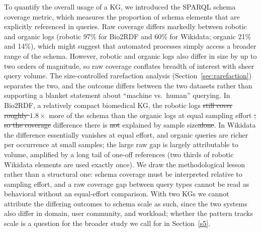 \documentclass[sw]{iosart2x}
\providecommand{\DIFadd}[1]{{\protect\color{blue}\uwave{#1}}} %
\providecommand{\DIFdel}[1]{{\protect\color{red}\sout{#1}}} %
\providecommand{\DIFaddbegin}{} %
\providecommand{\DIFaddend}{} %
\providecommand{\DIFdelbegin}{} %
\providecommand{\DIFdelend}{} %
\providecommand{\DIFscaledelfig}{0.5}
\newlength{\DIFdelgraphicswidth} %
\newlength{\DIFdelgraphicsheight} %
\providecommand{\DIFaddincludegraphics}[2][]{{\color{blue}\fbox{\DIFOincludegraphics[#1]{#2}}}} %
\providecommand{\DIFdelincludegraphics}[2][]{%
\sbox{\DIFdelgraphicsbox}{\DIFOincludegraphics[#1]{#2}}%
\settoboxwidth{\DIFdelgraphicswidth}{\DIFdelgraphicsbox} %
\settoboxtotalheight{\DIFdelgraphicsheight}{\DIFdelgraphicsbox} %
\scalebox{\DIFscaledelfig}{%
\parbox[b]{\DIFdelgraphicswidth}{\usebox{\DIFdelgraphicsbox}\\[-\baselineskip] \rule{\DIFdelgraphicswidth}{0em}}\llap{\resizebox{\DIFdelgraphicswidth}{\DIFdelgraphicsheight}{%
\setlength{\unitlength}{\DIFdelgraphicswidth}%
\begin{picture}(1,1)%
\thicklines\linethickness{2pt} %
{\color[rgb]{1,0,0}\put(0,0){\framebox(1,1){}}}%
{\color[rgb]{1,0,0}\put(0,0){\line( 1,1){1}}}%
{\color[rgb]{1,0,0}\put(0,1){\line(1,-1){1}}}%
\end{picture}%
}\hspace*{3pt}}} %
} %
\DeclareRobustCommand{\DIFaddbegin}{\DIFOaddbegin \let\includegraphics\DIFaddincludegraphics} %
\DeclareRobustCommand{\DIFaddend}{\DIFOaddend \let\includegraphics\DIFOincludegraphics} %
\DeclareRobustCommand{\DIFdelbegin}{\DIFOdelbegin \let\includegraphics\DIFdelincludegraphics} %
\DeclareRobustCommand{\DIFdelend}{\DIFOaddend \let\includegraphics\DIFOincludegraphics} %
\begin{document}
To quantify the overall usage of a KG, we introduced the SPARQL schema coverage metric, which measures the proportion of schema elements that are explicitly referenced in queries. Raw coverage differs markedly between robotic and organic logs (robotic 97\% for Bio2RDF and 60\% for Wikidata; organic 21\% and 14\%), which might suggest that automated processes simply access a broader range of the schema. However, robotic and organic logs also differ in size by up to two orders of magnitude, so raw coverage conflates breadth of interest with sheer query volume. The size-controlled rarefaction analysis (Section~\ref{sec:rarefaction}) separates the two, and the outcome differs between the two datasets rather than supporting a blanket statement about ``machine vs.\ human'' querying. In Bio2RDF, a relatively compact biomedical KG, the robotic logs \DIFdelbegin \DIFdel{still cover roughly $1.8\times$ }\DIFdelend \DIFaddbegin \DIFadd{cover no }\DIFaddend more of the schema than the organic logs at equal sampling effort \DIFdelbegin \DIFdel{, so the coverage }\DIFdelend \DIFaddbegin \DIFadd{($0.88\times$, 95\% CI $[0.75, 1.02]$), so the raw }\DIFaddend difference there is \DIFdelbegin \DIFdel{not }\DIFdelend explained by sample size\DIFdelbegin \DIFdel{alone}\DIFdelend . In Wikidata the difference essentially vanishes at equal effort, and organic queries are richer per occurrence at small samples; the large raw gap is largely attributable to volume, amplified by a long tail of one-off references (two thirds of robotic Wikidata elements are used exactly once). We draw the methodological lesson rather than a structural one: schema coverage must be interpreted relative to sampling effort, and a raw coverage gap between query types cannot be read as behavioral without an equal-effort comparison. With two KGs we cannot attribute the differing outcomes to schema scale as such, since the two systems also differ in domain, user community, and workload; whether the pattern tracks scale is a question for the broader study we call for in Section~\ref{s5}.
\end{document}
